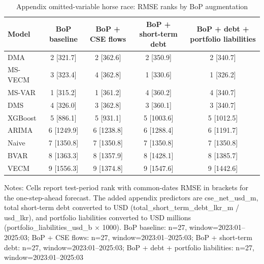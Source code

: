 \begin{table}[htbp]
\centering
\scriptsize
\caption{Appendix omitted-variable horse race: RMSE ranks by BoP augmentation}
\label{tab:omitted_variable_robustness}
\begin{tabular}{lcccc}
\toprule
Model & BoP baseline & BoP + CSE flows & BoP + short-term debt & BoP + debt + portfolio liabilities \\
\midrule
DMA & 2 [321.7] & 2 [362.6] & 2 [350.9] & 2 [340.7] \\
MS-VECM & 3 [323.4] & 4 [362.8] & 1 [330.6] & 1 [326.2] \\
MS-VAR & 1 [315.2] & 1 [361.2] & 4 [360.2] & 4 [340.7] \\
DMS & 4 [326.0] & 3 [362.8] & 3 [360.1] & 3 [340.7] \\
XGBoost & 5 [886.1] & 5 [931.1] & 5 [1003.6] & 5 [1012.5] \\
ARIMA & 6 [1249.9] & 6 [1238.8] & 6 [1288.4] & 6 [1191.7] \\
Naive & 7 [1350.8] & 7 [1350.8] & 7 [1350.8] & 7 [1350.8] \\
BVAR & 8 [1363.3] & 8 [1357.9] & 8 [1428.1] & 8 [1385.7] \\
VECM & 9 [1556.3] & 9 [1374.8] & 9 [1547.6] & 9 [1442.6] \\
\bottomrule
\end{tabular}
\begin{tablenotes}
\footnotesize
\item Notes: Cells report test-period rank with common-dates RMSE in brackets for the one-step-ahead forecast. The added appendix predictors are cse\_net\_usd\_m, total short-term debt converted to USD (total\_short\_term\_debt\_lkr\_m / usd\_lkr), and portfolio liabilities converted to USD millions (portfolio\_liabilities\_usd\_b $\times$ 1000). BoP baseline: n=27, window=2023:01--2025:03; BoP + CSE flows: n=27, window=2023:01--2025:03; BoP + short-term debt: n=27, window=2023:01--2025:03; BoP + debt + portfolio liabilities: n=27, window=2023:01--2025:03
\end{tablenotes}
\end{table}